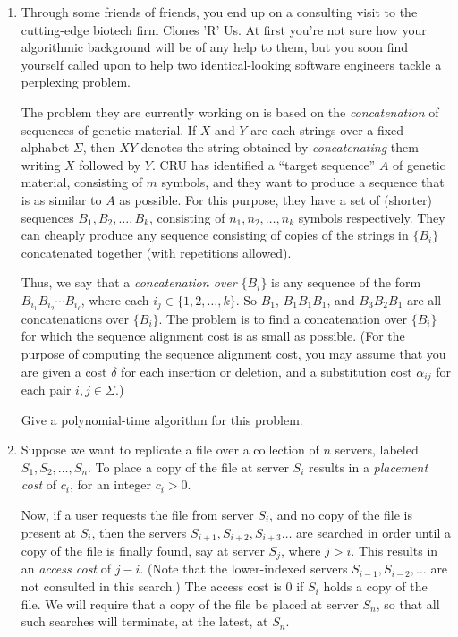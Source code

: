 \documentclass[12pt]{article}
\begin{document}
\begin{enumerate}

\item

Through some friends of friends, you end up 
on a consulting visit to the cutting-edge
biotech firm Clones 'R' Us.
At first you're not sure how your algorithmic background
will be of any help to them, but you soon find yourself
called upon to help two identical-looking software engineers
tackle a perplexing problem.

The problem they are currently working on is based on
the {\em concatenation} of sequences of genetic material.
If $X$ and $Y$ are each strings over a fixed alphabet $\Sigma$,
then $XY$ denotes the string obtained by {\em concatenating} them ---
writing $X$ followed by $Y$.
CRU has identified a ``target sequence''
$A$ of genetic material, consisting of $m$ symbols,
and they want to produce a sequence that is as similar to $A$ as possible.
For this purpose, they have a set of (shorter) sequences
$B_1, B_2, \ldots, B_k$, consisting of $n_1, n_2, \ldots, n_k$
symbols respectively.
They can cheaply produce any sequence consisting of copies
of the strings in $\{B_i\}$ concatenated together (with repetitions allowed).

Thus, we say that a {\em concatenation over $\{B_i\}$} is any
sequence of the form $B_{i_1} B_{i_2} \cdots B_{i_\ell}$,
where each $i_j \in \{1, 2, \ldots, k\}$.
So $B_1$, $B_1 B_1 B_1$, and $B_3 B_2 B_1$ are all
concatenations over $\{B_i\}$.
The problem is to find a concatenation over $\{B_i\}$
for which the sequence alignment cost is as small as possible.
(For the purpose of computing the sequence alignment cost, you may
assume that you are given a cost $\delta$ for each insertion
or deletion, and a substitution cost $\alpha_{ij}$ 
for each pair $i, j \in \Sigma$.)

Give a polynomial-time algorithm for this problem.


\item

Suppose we want to replicate a file over a collection of
$n$ servers, labeled $S_1, S_2, \ldots, S_n$.  To place a copy
of the file at server $S_i$ results in a {\em placement cost} of $c_i$,
for an integer $c_i > 0$.

Now, if a user requests the file from server $S_i$, and no
copy of the file is present at $S_i$, then the servers $S_{i+1},
S_{i+2}, S_{i+3} \ldots$ are searched in order until a copy of the file
is finally found, say at server $S_j$, where $j > i$.
This results in an {\em access cost} of $j - i$.
(Note that the lower-indexed servers $S_{i-1}, S_{i-2}, \ldots$
are not consulted in this search.)
The access cost is $0$ if $S_i$ holds a copy of the file.
We will require that a copy of the file be placed at server $S_n$,
so that all such searches will terminate, at the latest, at $S_n$.


\end{enumerate}
\end{document}
